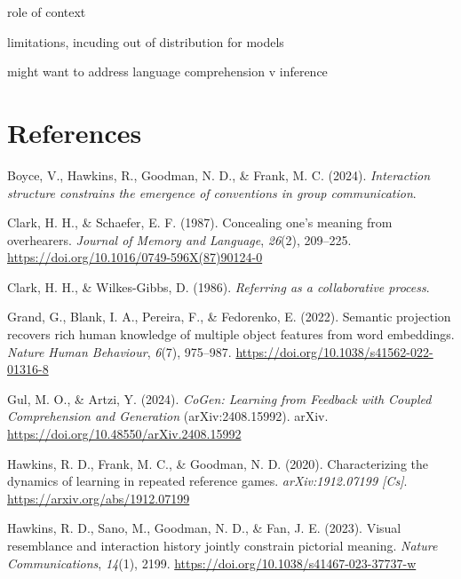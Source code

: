 \documentclass[10pt, letterpaper]{article}
\begin{document}
role of context

limitations, incuding out of distribution for models

might want to address language comprehension v inference

\section{References}\label{references}

\setlength{\parindent}{-0.1in} 
\setlength{\leftskip}{0.125in}

\noindent

\label{refs}
\begin{CSLReferences}{1}{0}
Boyce, V., Hawkins, R., Goodman, N. D., \& Frank, M. C. (2024).
\emph{Interaction structure constrains the emergence of conventions in
group communication}.

Clark, H. H., \& Schaefer, E. F. (1987). Concealing one's meaning from
overhearers. \emph{Journal of Memory and Language}, \emph{26}(2),
209--225. \url{https://doi.org/10.1016/0749-596X(87)90124-0}

Clark, H. H., \& Wilkes-Gibbs, D. (1986). \emph{Referring as a
collaborative process}.

Grand, G., Blank, I. A., Pereira, F., \& Fedorenko, E. (2022). Semantic
projection recovers rich human knowledge of multiple object features
from word embeddings. \emph{Nature Human Behaviour}, \emph{6}(7),
975--987. \url{https://doi.org/10.1038/s41562-022-01316-8}

Gul, M. O., \& Artzi, Y. (2024). \emph{{CoGen}: {Learning} from
{Feedback} with {Coupled Comprehension} and {Generation}}
(arXiv:2408.15992). arXiv.
\url{https://doi.org/10.48550/arXiv.2408.15992}

Hawkins, R. D., Frank, M. C., \& Goodman, N. D. (2020). Characterizing
the dynamics of learning in repeated reference games.
\emph{arXiv:1912.07199 {[}Cs{]}}. \url{https://arxiv.org/abs/1912.07199}

Hawkins, R. D., Sano, M., Goodman, N. D., \& Fan, J. E. (2023). Visual
resemblance and interaction history jointly constrain pictorial meaning.
\emph{Nature Communications}, \emph{14}(1), 2199.
\url{https://doi.org/10.1038/s41467-023-37737-w}


\end{CSLReferences}
\end{document}
